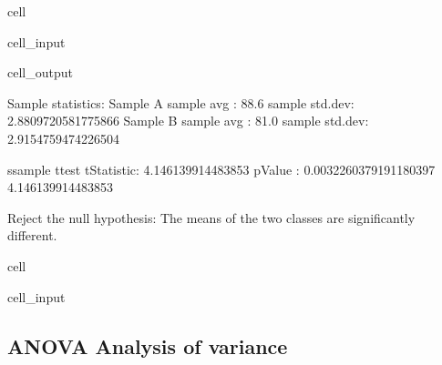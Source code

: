 \documentclass[letterpaper,10pt,italian]{jupyterBook}
\begin{document}
\begin{sphinxuseclass}{cell}
\begin{sphinxVerbatimInput}
\begin{sphinxuseclass}{cell_input}
\end{sphinxuseclass}\end{sphinxVerbatimInput}
\begin{sphinxVerbatimOutput}

\begin{sphinxuseclass}{cell_output}
\begin{sphinxVerbatim}[commandchars=\\\{\}]
Sample statistics:
Sample A
 sample avg    : 88.6
 sample std.dev: 2.8809720581775866
Sample B
 sample avg    : 81.0
 sample std.dev: 2.9154759474226504

s\PYGZhy{}sample t\PYGZhy{}test
 t\PYGZhy{}Statistic: 4.146139914483853
 p\PYGZhy{}Value    : 0.0032260379191180397
4.146139914483853

Reject the null hypothesis: The means of the two classes are significantly different.
\end{sphinxVerbatim}

\begin{sphinxVerbatim}
\end{sphinxVerbatim}

\noindent{}

\end{sphinxuseclass}\end{sphinxVerbatimOutput}

\end{sphinxuseclass}
\begin{sphinxuseclass}{cell}\begin{sphinxVerbatimInput}

\begin{sphinxuseclass}{cell_input}
\begin{sphinxVerbatim}[commandchars=\\\{\}]
\end{sphinxVerbatim}

\end{sphinxuseclass}\end{sphinxVerbatimInput}

\end{sphinxuseclass}
\sphinxstepscope


\subsection{ANOVA \sphinxhyphen{} Analysis of variance}
\label{\detokenize{ch/statistics/anova:anova-analysis-of-variance}}\label{\detokenize{ch/statistics/anova::doc}}
\end{document}
